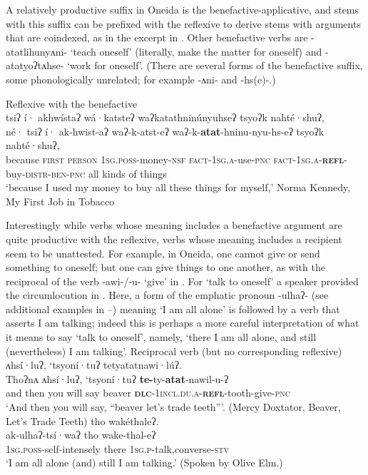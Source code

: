 \documentclass[output=paper]{langscibook}
\begin{document}
A relatively productive suffix in Oneida is the benefactive-applicative, and stems with this suffix can be prefixed with the reflexive to derive stems with arguments that are coindexed, as in the excerpt in . Other benefactive verbs are {{}-atatlihunyʌni-} ‘teach one\-self’ (literally, make the matter for oneself) and {{}-atatyoʔtʌhse-} ‘work for oneself’. (There are several forms of the benefactive suffix, some phonologically unrelated; for example {{}-ʌni-} and {{}-hs(e)-}.)

\ea%
    \label{ex:oneida:26}
     Reflexive with the benefactive\\
   {tsiʔ}  {í·} {akhwístaʔ}  {wá·katsteʔ}  {waʔkatathninúnyuhseʔ}  {tsyoʔk} {nahté·shuʔ,}\\
  {né·} {tsiʔ} {í·} ak-hwist-aʔ  waʔ-k-atst-eʔ waʔ-k-\textbf{atat}-hninu-nyu-hs-eʔ {tsyoʔk} {nahté·shuʔ,}\\
  because  \textsc{first} \textsc{person}  \textsc{1sg.poss}-money\textsc{-nsf}  \textsc{fact-1sg.a}-use\textsc{-pnc} \textsc{fact-1sg.a-}\textbf{\textsc{refl}}-buy\textsc{-distr-ben-pnc}      all kinds of things\\
 \glt ‘because I used my money to buy all these things for myself,’ Norma Kennedy, {My}   {First} {Job} {in} {Tobacco}
  \z

Interestingly while verbs whose meaning includes a benefactive argument are quite productive with the reflexive, verbs whose meaning includes a recipient seem to be unat\-tested. For example, in Oneida, one cannot give or send something to oneself; but one can give things to one another, as with the reciprocal of the verb {{}-awi-/-u-} ‘give’ in . For ‘talk to oneself’ a speaker provided the circumlocution in . Here, a form of the em\-phatic pronoun {{}-ulhaʔ-} (see additional examples in --) meaning ‘I am all alone’ is followed by a verb that asserts I am talking; indeed this is perhaps a more careful interpre\-tation of what it means to say ‘talk to oneself’, namely, ‘there I am all alone, and {still} (nevertheless) I am talking’.
\ea%
    \label{ex:oneida:27}
    \ea Reciprocal verb (but no corresponding reflexive)\label{ex:oneida:27a}\\
     {ʌhsí·luʔ,} {‘tsyoní·tuʔ}     {tetyatatnawi·lúʔ.}\\
    {Thoʔnʌ} {ʌhsí·luʔ,} {‘tsyoní·tuʔ} \textbf{te-}ty-\textbf{atat}{}-nawil-u-ʔ\\
    {and then} {you will say} beaver      \textbf{\textsc{dlc}}\textsc{{}-1incl.du.a-}\textbf{\textsc{refl}}\textsc{{}-}tooth-give\textsc{{}-pnc}\\
   \glt ‘And then you will say, ``beaver let’s trade teeth{''}'. (Mercy Doxtator, {Beaver, Let’s Trade Teeth})
   \ex \label{ex:oneida:27b}
    {tho} {wakéthaleʔ.}\\
         ak-ulhaʔ-tsí·waʔ {tho} wake-thal-eʔ\\
          \textsc{1sg.poss-}self-intensely    there \textsc{1sg.p-}talk,converse\textsc{{}-stv}\\
    \glt ‘I am all alone (and) still I am talking.’ (Spoken by Olive Elm.)    
    \z
\z
\end{document}
